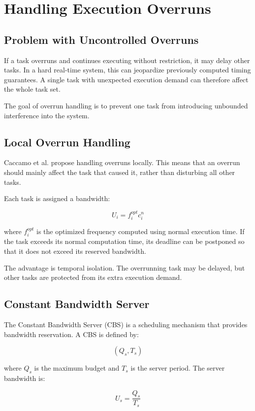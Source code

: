 \documentclass[conference]{IEEEtran}
\begin{document}
\section{Handling Execution Overruns}

\subsection{Problem with Uncontrolled Overruns}

If a task overruns and continues executing without restriction, it may delay other tasks. In a hard real-time system, this can jeopardize previously computed timing guarantees. A single task with unexpected execution demand can therefore affect the whole task set.

The goal of overrun handling is to prevent one task from introducing unbounded interference into the system.

\subsection{Local Overrun Handling}

Caccamo et al. propose handling overruns locally. This means that an overrun should mainly affect the task that caused it, rather than disturbing all other tasks.

Each task is assigned a bandwidth:

\[
U_i = f_i^{opt} c_i^n
\]

where $f_i^{opt}$ is the optimized frequency computed using normal execution time. If the task exceeds its normal computation time, its deadline can be postponed so that it does not exceed its reserved bandwidth.

The advantage is temporal isolation. The overrunning task may be delayed, but other tasks are protected from its extra execution demand.

\subsection{Constant Bandwidth Server}

The Constant Bandwidth Server (CBS) is a scheduling mechanism that provides bandwidth reservation. A CBS is defined by:

\[
(Q_s, T_s)
\]

where $Q_s$ is the maximum budget and $T_s$ is the server period. The server bandwidth is:

\[
U_s = \frac{Q_s}{T_s}
\]
\end{document}
